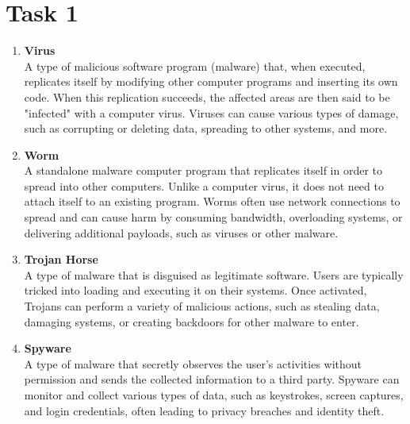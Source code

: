 \chapter*{\centering Task 1}
\begin{enumerate}
	\item{\textbf{Virus}} \\
	A type of malicious software program (malware) that, when executed, replicates itself by modifying other computer programs and inserting its own code. When this replication succeeds, the affected areas are then said to be "infected" with a computer virus. Viruses can cause various types of damage, such as corrupting or deleting data, spreading to other systems, and more.
	\item{\textbf {Worm }}\\
	A standalone malware computer program that replicates itself in order to spread into other computers. Unlike a computer virus, it does not need to attach itself to an existing program. Worms often use network connections to spread and can cause harm by consuming bandwidth, overloading systems, or delivering additional payloads, such as viruses or other malware.
	\item{\textbf {Trojan Horse}} \\
	A type of malware that is disguised as legitimate software. Users are typically tricked into loading and executing it on their systems. Once activated, Trojans can perform a variety of malicious actions, such as stealing data, damaging systems, or creating backdoors for other malware to enter.
	\item{\textbf {Spyware}} \\
	A type of malware that secretly observes the user's activities without permission and sends the collected information to a third party. Spyware can monitor and collect various types of data, such as keystrokes, screen captures, and login credentials, often leading to privacy breaches and identity theft.
\end{enumerate}